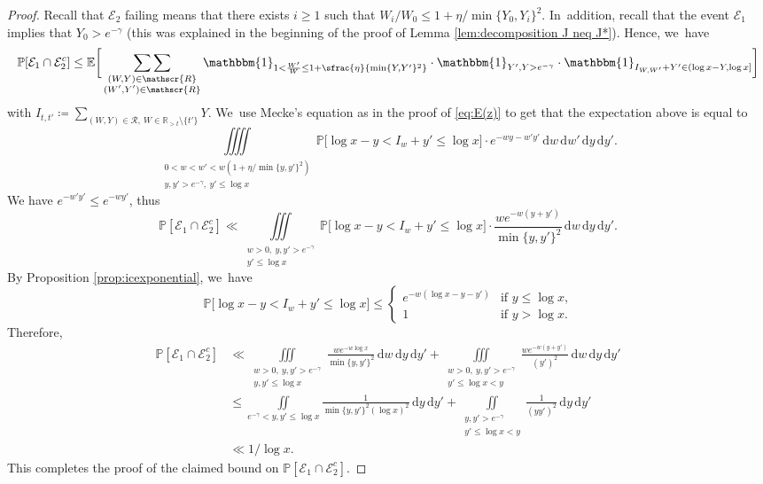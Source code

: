 \documentclass[10pt]{amsart}
\newcommand{\RR}{\mathbb{R}}
\newcommand{\PP}{\mathbb{P}}
\newcommand{\EE}{\mathbb{E}}
\newcommand{\dee}{\,\mathrm{d}}
\newcommand{\one}{\mathbbm{1}}
\newcommand{\EC}{\mathcal{E}}
\newcommand{\RS}{\mathscr{R}}
\newcommand{\bg}{\big}
\newcommand{\bggg}{\bigg}
\theoremstyle{plain}
\theoremstyle{definition}
\begin{document}
\begin{proof} Recall that $\EC_2$ failing means that there exists $i\ge1$ such that $W_i/W_0\le 1+\eta/\min\{Y_0, Y_i\}^2$. In~addition, recall that the event $\EC_1$ implies that $Y_0 > e^{-\gamma}$ (this was explained in the beginning of the proof of Lemma \ref{lem:decomposition J neq J*}). Hence, we~have
\[
\PP[\EC_1 \cap \EC_2^c] \le
\EE\bggg[ \mathop{\sum\sum}_{\substack{(W,Y) \in \RS \\ (W',Y')\in\RS}} \one_{1< \frac{W'}{W} \le 1+\sfrac{\eta}{\min\{Y,Y'\}^2}}\cdot\one_{Y',Y>e^{-\gamma}} \cdot \one_{I_{W, W'} + Y'\in(\log x-Y,\log x]} \bggg]
\]
with $I_{t, t'} \coloneqq \sum_{(W, Y) \in \RS,\ W \in \RR_{>t}\setminus\{t'\}} Y$. We~use Mecke's equation as in the proof of \eqref{eq:E(z)} to get that the expectation above is equal to
\[
\iiiint\limits_{\substack{0 < w < w' < w(1+\eta/\min\{y,y'\}^2)\\ y, y' > e^{-\gamma},\ y'\le \log x}} \PP\bg[\log x - y<I_w + y' \le \log x\bg]\cdot e^{-wy-w'y'}
\dee w\dee w'\dee y\dee y'.
\]
We have $e^{-w'y'}\le e^{-wy'}$, thus
\[
\PP[\EC_1 \cap \EC_2^c] \ll
\iiint\limits_{\substack{w>0,\ y, y' > e^{-\gamma} \\ y'\le \log x}}
\PP\bg[\log x - y<I_w + y' \le \log x\bg]\cdot \frac{we^{-w(y+y')}}{\min\{y,y'\}^2} \dee w\dee y\dee y'.
\]
By Proposition \ref{prop:icexponential}, we~have
\[
\PP\bg[\log x - y<I_w + y' \le \log x\bg] \le \begin{cases}
e^{-w(\log x - y-y')}&\text{if $y \le \log x$,} \\
1 & \text{if $y > \log x$.}
\end{cases}
\]
Therefore,
\begin{align*}
\PP[\EC_1 \cap \EC_2^c]
&\ll \iiint\limits_{\substack{w>0,\ y, y' > e^{-\gamma} \\ y,y'\le \log x}}
\frac{we^{-w\log x}}{\min\{y,y'\}^2}\dee w\dee y\dee y'
+\iiint\limits_{\substack{w>0,\ y, y' > e^{-\gamma} \\ y'\le \log x<y}}
\frac{we^{-w(y+y')}}{(y')^2}\dee w\dee y\dee y' \\
&\le \iint\limits_{e^{-\gamma}<y, y'\le \log x}
\frac{1}{\min\{y,y'\}^2(\log x)^2}\dee y\dee y'
+\iint\limits_{\substack{y, y' > e^{-\gamma} \\ y'\le \log x<y}}
\frac{1}{(yy')^2} \dee y\dee y' \\
&\ll 1/\log x.
\end{align*}
This completes the proof of the claimed bound on $\PP[\EC_1\cap \EC_2^c]$.


\end{proof}
\end{document}
